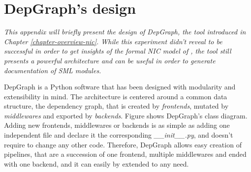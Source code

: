 \documentclass{kththesis}
\begin{document}
{%


\printbibliography[heading=bibintoc]

\appendix

\chapter{DepGraph's design} \label{appendix_depgraph}
\vspace{-1cm}
\textit{This appendix will briefly present the design of DepGraph, the tool introduced in Chapter \ref{chapter-overview-nic}. While this experiment didn't reveal to be successful in order to get insights of the formal NIC model of \cite{haglund_formal_2016}, the tool still presents a powerful architecture and can be useful in order to generate documentation of \gls{SML} modules.}

DepGraph is a Python software that has been designed with modularity and extensibility in mind. The architecture is centered around a common data structure, the dependency graph, that is created by \textit{frontends}, mutated by \textit{middlewares} and exported by \textit{backends}. Figure shows DepGraph's class diagram. Adding new frontends, middlewares or backends is as simple as adding one independent file and declare it the corresponding \textit{\_\_init\_\_.py}, and doesn't require to change any other code. Therefore, DepGraph allows easy creation of pipelines, that are a succession of one frontend, multiple middlewares and ended with one backend, and it can easily by extended to any need.

}
\end{document}

